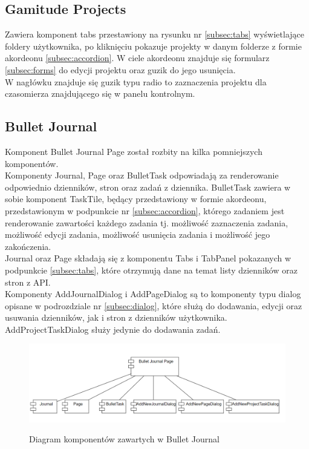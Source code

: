\documentclass[a4paper,11pt]{report}
\begin{document}
\subsection{Gamitude Projects}
Zawiera komponent tabs przestawiony na rysunku nr \ref{subsec:tabs} wyświetlające foldery użytkownika, po kliknięciu pokazuje projekty w danym folderze z formie akordeonu \ref{subsec:accordion}.
W ciele akordeonu znajduje się formularz \ref{subsec:forms} do edycji projektu oraz guzik do jego usunięcia.\\
W nagłówku znajduje się guzik typu radio to zaznaczenia projektu dla czasomierza znajdującego się w panelu kontrolnym.

\subsection{Bullet Journal}
Komponent Bullet Journal Page został rozbity na kilka pomniejszych komponentów.\\
 Komponenty Journal, Page oraz BulletTask odpowiadają za renderowanie odpowiednio dzienników, stron oraz zadań z dziennika.
 BulletTask zawiera w sobie komponent TaskTile, będący przedstawiony w formie akordeonu, przedstawionym w podpunkcie nr \ref{subsec:accordion},
 którego zadaniem jest renderowanie zawartości każdego zadania tj. możliwość zaznaczenia zadania, możliwość edycji zadania, możliwość usunięcia zadania i możliwość jego zakończenia.\\
 Journal oraz Page składają się z komponentu Tabs i TabPanel pokazanych w podpunkcie \ref{subsec:tabs}, które otrzymują dane na temat listy dzienników oraz stron z API.\\
 Komponenty AddJournalDialog i AddPageDialog są to komponenty typu dialog opisane w podrozdziale nr \ref{subsec:dialog},
 które służą do dodawania, edycji oraz usuwania dzienników, jak i stron z dzienników użytkownika.
 AddProjectTaskDialog służy jedynie do dodawania zadań.\\
\begin{figure}[H]
	\centering
	\includegraphics[scale=0.5]{implementacja/frontend/bullet_journal_diagram}\\
	\caption{Diagram komponentów zawartych w Bullet Journal}
	\label{fig:bullet_diagram}
\end{figure}
\end{document}
